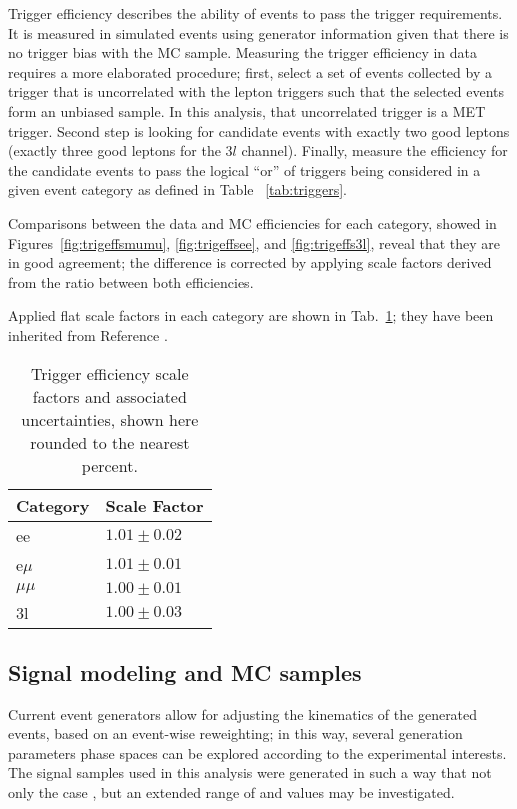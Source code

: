 Trigger efficiency describes the ability of events to pass the trigger requirements. It is measured in simulated events using generator information given that there is no trigger bias with the MC sample. Measuring the trigger efficiency in data requires a more elaborated procedure; first, select a set of events collected by a trigger that is uncorrelated with the lepton triggers such that the selected events form an unbiased sample. In this analysis, that uncorrelated trigger is a MET trigger. Second step is looking for candidate events with exactly two good leptons (exactly three good leptons for the $3l$ channel). Finally,  measure the efficiency for the candidate events to pass the logical ``or'' of triggers being considered in a given event category as defined in Table ~\ref{tab:triggers}.

Comparisons between the data and MC efficiencies for each category, showed in Figures~\ref{fig:trigeffsmumu}, \ref{fig:trigeffsee}, and \ref{fig:trigeffs3l}, reveal that they are in good agreement; the difference is corrected by applying scale factors derived from the ratio between both efficiencies.

Applied flat scale factors in each category are shown in Tab.~\ref{tab:trigSFs}; they have been inherited from Reference \cite{CMS_AN_2017-029}. 
\begin{table}
\centering
\begin{tabular}{ll}
Category & Scale Factor \\\hline
    ee   & $1.01 \pm 0.02$ \\
e$\mu$   & $1.01 \pm 0.01$ \\
$\mu\mu$ & $1.00 \pm 0.01$ \\
3l       & $1.00 \pm 0.03$ \\\hline
\end{tabular}
\caption[Trigger efficiency scale factors and associated uncertainties.]{Trigger efficiency scale factors and associated uncertainties, shown here rounded to the nearest percent.}
\label{tab:trigSFs}
\end{table}

\subsection{Signal modeling and MC samples}

Current event generators allow for adjusting the kinematics of the generated events, based on an event-wise reweighting; in this way, several generation parameters phase spaces can be explored according to the experimental interests. The signal samples used in this analysis were generated in such a way that not only the case , but an extended range of \Ct and \CV values may be investigated.

